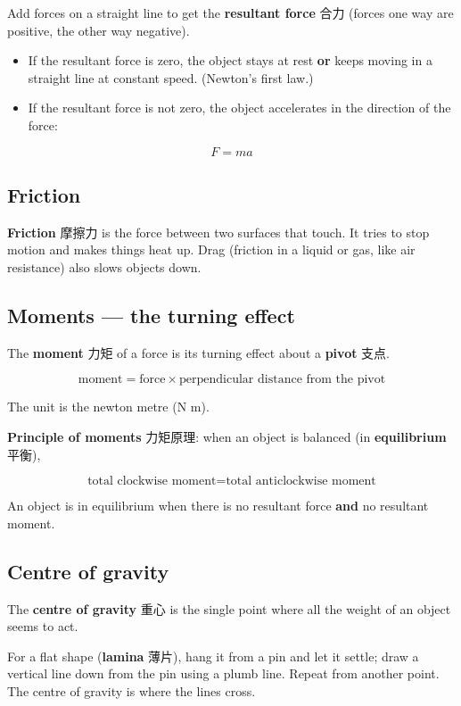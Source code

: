 \documentclass[11pt]{article}
\begin{document}
Add forces on a straight line to get the \textbf{resultant force} 合力 (forces one way are positive, the other way negative).

\begin{itemize}
\item If the resultant force is zero, the object stays at rest \textbf{or} keeps moving in a straight line at constant speed. (Newton's first law.)

\item If the resultant force is not zero, the object accelerates in the direction of the force:

\end{itemize}

\[
F = ma
\]

\subsection*{Friction}

\textbf{Friction} 摩擦力 is the force between two surfaces that touch. It tries to stop motion and makes things heat up. Drag (friction in a liquid or gas, like air resistance) also slows objects down.

\subsection*{Moments — the turning effect}

The \textbf{moment} 力矩 of a force is its turning effect about a \textbf{pivot} 支点.

\[
\text{moment} = \text{force} \times \text{perpendicular distance from the pivot}
\]

The unit is the newton metre (N m).

\textbf{Principle of moments} 力矩原理: when an object is balanced (in \textbf{equilibrium} 平衡),

\[
\text{total clockwise moment} = \text{total anticlockwise moment}
\]

An object is in equilibrium when there is no resultant force \textbf{and} no resultant moment.

\subsection*{Centre of gravity}

The \textbf{centre of gravity} 重心 is the single point where all the weight of an object seems to act.

For a flat shape (\textbf{lamina} 薄片), hang it from a pin and let it settle; draw a vertical line down from the pin using a plumb line. Repeat from another point. The centre of gravity is where the lines cross.
\end{document}

